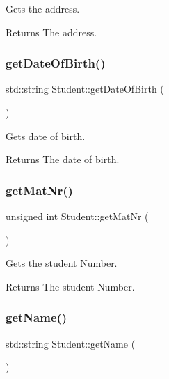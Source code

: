 Gets the address. 

\begin{DoxyReturn}{Returns}
The address. 
\end{DoxyReturn}
\mbox{\label{class_student_a9c46502480d94c46865eee494f96bfe0}} 
\subsubsection{\texorpdfstring{get\+Date\+Of\+Birth()}{getDateOfBirth()}}
{\footnotesize\ttfamily std\+::string Student\+::get\+Date\+Of\+Birth (\begin{DoxyParamCaption}{ }\end{DoxyParamCaption})}



Gets date of birth. 

\begin{DoxyReturn}{Returns}
The date of birth. 
\end{DoxyReturn}
\mbox{\label{class_student_a2f996798d6c9b904e3abf902f68d3c0b}} 
\subsubsection{\texorpdfstring{get\+Mat\+Nr()}{getMatNr()}}
{\footnotesize\ttfamily unsigned int Student\+::get\+Mat\+Nr (\begin{DoxyParamCaption}{ }\end{DoxyParamCaption})}



Gets the student Number. 

\begin{DoxyReturn}{Returns}
The student Number. 
\end{DoxyReturn}
\mbox{\label{class_student_a729c900a0e95c46f90668f527a72ad34}} 
\subsubsection{\texorpdfstring{get\+Name()}{getName()}}
{\footnotesize\ttfamily std\+::string Student\+::get\+Name (\begin{DoxyParamCaption}{ }\end{DoxyParamCaption})}



